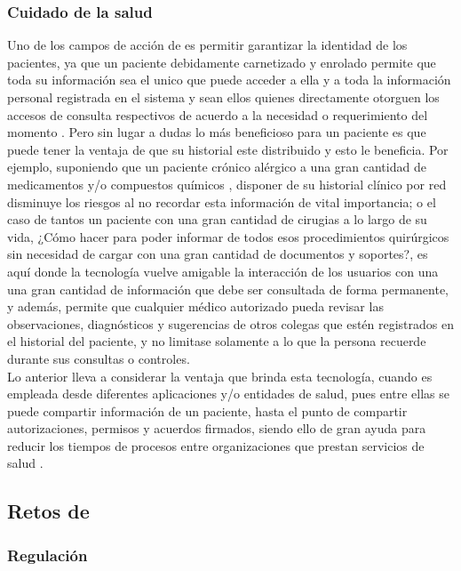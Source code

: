 \subsubsection{Cuidado de la salud}
Uno de los campos de acción de \blckchn es permitir garantizar la identidad de los pacientes, ya que un paciente debidamente carnetizado y enrolado permite que toda su información sea el unico que puede acceder a ella y a toda la información personal registrada en el sistema y sean ellos quienes directamente otorguen los accesos de consulta respectivos de acuerdo a la necesidad o requerimiento del momento \citep{angraal2017blockchain}. Pero sin lugar a dudas lo más beneficioso para un paciente es que puede tener la ventaja de que su historial este distribuido y esto le beneficia. Por ejemplo, suponiendo que un paciente crónico alérgico a una gran cantidad de medicamentos y/o compuestos químicos , disponer de su historial clínico por red disminuye los riesgos al no recordar esta información de vital importancia; o el caso de tantos un paciente con una gran cantidad de cirugias a lo largo de su vida, ¿Cómo hacer para poder informar de todos esos procedimientos quirúrgicos sin necesidad de cargar con una gran cantidad de documentos y soportes?, es aquí donde la tecnología \blckchn vuelve amigable la interacción de los usuarios con una una gran cantidad de información que debe ser consultada de forma permanente, y además, permite que cualquier médico autorizado pueda revisar las observaciones, diagnósticos y sugerencias de otros colegas que estén registrados en el historial del paciente, y no limitase solamente a lo que la persona recuerde durante sus consultas o controles.
\\
Lo anterior lleva a considerar la ventaja que brinda esta tecnología, cuando es empleada desde diferentes aplicaciones y/o entidades de salud, pues entre ellas se puede compartir información de un paciente, hasta el punto de compartir autorizaciones, permisos y acuerdos firmados, siendo ello de gran ayuda para reducir los tiempos de procesos entre organizaciones que prestan servicios de salud \citep{angraal2017blockchain}.


\subsection{Retos de \blckchn}
\subsubsection{Regulación}

